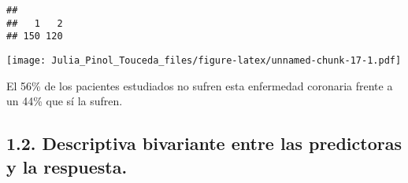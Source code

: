 \documentclass[]{article}
\newenvironment{Shaded}{\begin{snugshade}}{\end{snugshade}}
\newcommand{\KeywordTok}[1]{\textcolor[rgb]{0.13,0.29,0.53}{\textbf{#1}}}
\newcommand{\DataTypeTok}[1]{\textcolor[rgb]{0.13,0.29,0.53}{#1}}
\newcommand{\DecValTok}[1]{\textcolor[rgb]{0.00,0.00,0.81}{#1}}
\newcommand{\StringTok}[1]{\textcolor[rgb]{0.31,0.60,0.02}{#1}}
\newcommand{\OperatorTok}[1]{\textcolor[rgb]{0.81,0.36,0.00}{\textbf{#1}}}
\newcommand{\NormalTok}[1]{#1}
\begin{document}
\begin{Shaded}
\end{Shaded}

\begin{verbatim}
## 
##   1   2 
## 150 120
\end{verbatim}

\begin{Shaded}
\end{Shaded}

\texttt{[image: Julia\_Pinol\_Touceda\_files/figure-latex/unnamed-chunk-17-1.pdf]}

El 56\% de los pacientes estudiados no sufren esta enfermedad coronaria
frente a un 44\% que sí la sufren.

\subsection{1.2. Descriptiva bivariante entre las predictoras y la
respuesta.}\label{descriptiva-bivariante-entre-las-predictoras-y-la-respuesta.}
\end{document}
